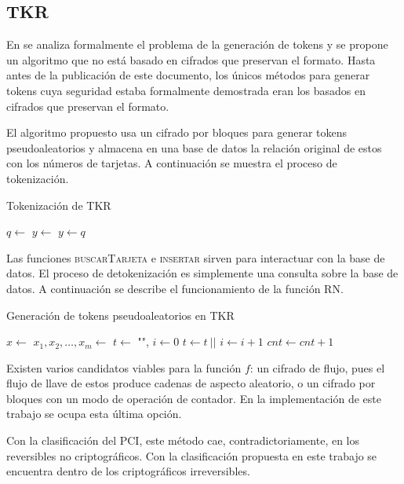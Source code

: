 %
%

\subsection{TKR}

En \cite{doc_sandra} se analiza formalmente el problema de la generación de
tokens y se propone un algoritmo que no está basado en cifrados que preservan el
formato. Hasta antes de la publicación de este documento, los únicos métodos
para generar tokens cuya seguridad estaba formalmente demostrada eran los
basados en cifrados que preservan el formato.

El algoritmo propuesto usa un cifrado por bloques para generar tokens
pseudoaleatorios y almacena en una base de datos la relación original de estos
con los números de tarjetas. A continuación se muestra el proceso de
tokenización.

\begin{algorithm}
  \caption{\label{tkr_tokenizacion} Tokenización de TKR}
  \begin{algorithmic}[1]
      \State $ q \gets $ 
        \State $ y \gets $ 
        \State {}
      \Else
        \State $ y \gets q $
      \EndIf
      \State {}
    \EndFunction
  \end{algorithmic}
\end{algorithm}

Las funciones \textsc{buscarTarjeta} e \textsc{insertar} sirven para interactuar
con la base de datos. El proceso de detokenización es simplemente una consulta
sobre la base de datos. A continuación se describe el funcionamiento de la
función \textsc{RN}.

\begin{algorithm}
  \caption{\label{tkr_rn} Generación de tokens pseudoaleatorios en TKR}
  \begin{algorithmic}[1]
      \State $ x \gets $ 
      \State $ x_1, x_2, \dots, x_m \gets $
      \State $ t \gets $ "", $ i \gets 0 $
          \State $ t \gets t \ || $ 
        \EndIf
        \State $ i \gets i + 1 $
      \EndWhile
      \State $ cnt \gets cnt + 1 $
    \EndFunction
  \end{algorithmic}
\end{algorithm}

Existen varios candidatos viables para la función $ f $: un cifrado de flujo,
pues el flujo de llave de estos produce cadenas de aspecto aleatorio, o un
cifrado por bloques con un modo de operación de contador. En la implementación
de este trabajo se ocupa esta última opción.

Con la clasificación del PCI, este método cae, contradictoriamente, en los
reversibles no criptográficos. Con la clasificación propuesta en este trabajo se
encuentra dentro de los criptográficos irreversibles.
